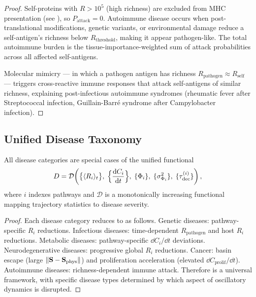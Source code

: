 \begin{proof}
Self-proteins with $R > 10^5$ (high richness) are excluded from MHC
presentation (see ), so $P_{\mathrm{attack}} = 0$.
Autoimmune disease occurs when post-translational modifications, genetic
variants, or environmental damage reduce a self-antigen's richness below
$R_{\mathrm{threshold}}$, making it appear pathogen-like.  The total
autoimmune burden is the tissue-importance-weighted sum of attack
probabilities across all affected self-antigens.

Molecular mimicry — in which a pathogen antigen has richness
$R_{\mathrm{pathogen}} \approx R_{\mathrm{self}}$ — triggers cross-reactive
immune responses that attack self-antigens of similar richness, explaining
post-infectious autoimmune syndromes (rheumatic fever after Streptococcal
infection, Guillain-Barré syndrome after Campylobacter infection).
\end{proof}

\subsection{Unified Disease Taxonomy}
\label{sec:ch07-unified-taxonomy}

\begin{theorem}
\label{thm:ch07-disease-unification}
All disease categories are special cases of the unified functional
\begin{equation}
  D = \mathcal{D}\!\left(
    \bigl\{\langle R_i\rangle_t\bigr\},\;
    \Bigl\{\frac{\dd C_i}{\dd t}\Bigr\},\;
    \{\Phi_i\},\;
    \{\sigma_{\Phi_i}^2\},\;
    \{\tau_{\mathrm{dec}}^{(i)}\}
  \right),
  \label{eq:ch07-disease-unification}
\end{equation}
where $i$ indexes pathways and $\mathcal{D}$ is a monotonically increasing
functional mapping trajectory statistics to disease severity.
\end{theorem}

\begin{proof}
Each disease category reduces to  as
follows.  Genetic diseases: pathway-specific $R_i$ reductions.  Infectious
diseases: time-dependent $R_{\mathrm{pathogen}}$ and host $R_i$ reductions.
Metabolic diseases: pathway-specific $\dd C_i/\dd t$ deviations.
Neurodegenerative diseases: progressive global $R_i$ reductions.  Cancer:
basin escape (large $\|\mathbf{S} - \mathbf{S}_{\mathrm{phys}}\|$) and
proliferation acceleration (elevated $\dd C_{\mathrm{prolif}}/\dd t$).
Autoimmune diseases: richness-dependent immune attack.  Therefore
 is a universal framework, with specific
disease types determined by which aspect of oscillatory dynamics is
disrupted.
\end{proof}

